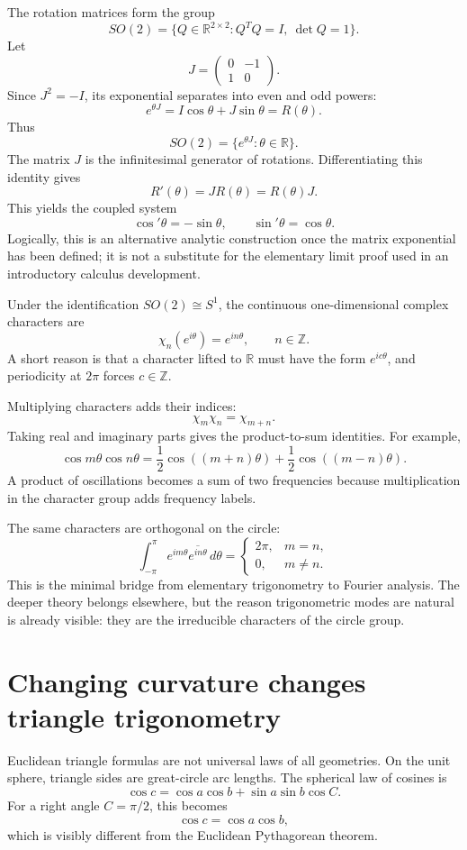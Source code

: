 The rotation matrices form the group
\[
  SO(2)
  =\{Q\in\mathbb R^{2\times2}:Q^TQ=I,\ \det Q=1\}.
\]
Let
\[
  J=
  \begin{pmatrix}
    0&-1\\
    1&0
  \end{pmatrix}.
\]
Since \(J^2=-I\), its exponential separates into even and odd powers:
\[
  e^{\theta J}
  =I\cos\theta+J\sin\theta
  =R(\theta).
\]
Thus
\[
  SO(2)=\{e^{\theta J}:\theta\in\mathbb R\}.
\]
The matrix \(J\) is the infinitesimal generator of rotations.  Differentiating this identity gives
\[
  R'(\theta)=JR(\theta)=R(\theta)J.
\]
This yields the coupled system
\[
  \cos'\theta=-\sin\theta,
  \qquad
  \sin'\theta=\cos\theta.
\]
Logically, this is an alternative analytic construction once the matrix exponential has been defined; it is not a substitute for the elementary limit proof used in an introductory calculus development.

Under the identification \(SO(2)\cong S^1\), the continuous one-dimensional complex characters are
\[
  \chi_n(e^{i\theta})=e^{in\theta},
  \qquad n\in\mathbb Z.
\]
A short reason is that a character lifted to \(\mathbb R\) must have the form \(e^{ic\theta}\), and periodicity at \(2\pi\) forces \(c\in\mathbb Z\).

Multiplying characters adds their indices:
\[
  \chi_m\chi_n=\chi_{m+n}.
\]
Taking real and imaginary parts gives the product-to-sum identities.  For example,
\[
  \cos m\theta\cos n\theta
  =\frac12\cos((m+n)\theta)
   +\frac12\cos((m-n)\theta).
\]
A product of oscillations becomes a sum of two frequencies because multiplication in the character group adds frequency labels.

The same characters are orthogonal on the circle:
\[
  \int_{-\pi}^{\pi}
  e^{im\theta}\overline{e^{in\theta}}\,d\theta
  =
  \begin{cases}
    2\pi,&m=n,\\
    0,&m\ne n.
  \end{cases}
\]
This is the minimal bridge from elementary trigonometry to Fourier analysis.  The deeper theory belongs elsewhere, but the reason trigonometric modes are natural is already visible: they are the irreducible characters of the circle group.

\section{Changing curvature changes triangle trigonometry}

Euclidean triangle formulas are not universal laws of all geometries.  On the unit sphere, triangle sides are great-circle arc lengths.  The spherical law of cosines is
\[
  \boxed{
  \cos c
  =\cos a\cos b
   +\sin a\sin b\cos C.}
\]
For a right angle \(C=\pi/2\), this becomes
\[
  \cos c=\cos a\cos b,
\]
which is visibly different from the Euclidean Pythagorean theorem.


